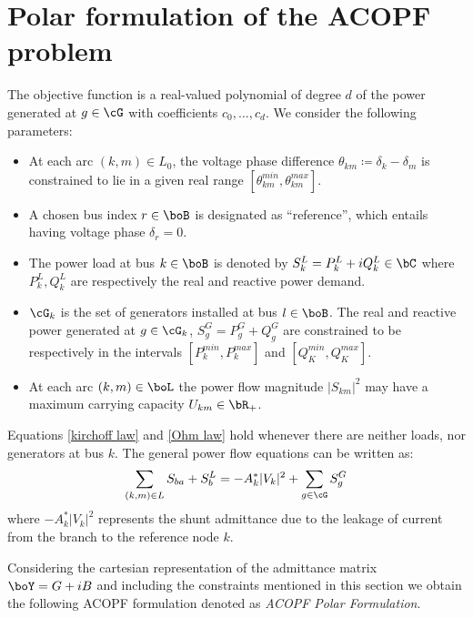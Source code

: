 \documentclass[11pt,a4paper,oneside,openany]{book}
\numberwithin{definition}{section}
\numberwithin{theorem}{section}
\numberwithin{problem}{section}
\begin{document}
\section{Polar formulation of the ACOPF problem}
The objective function is a real-valued polynomial of degree $d$ of the power generated at $g \in \cG$ with coefficients $c_{0},\ldots,c_{d}$.
We consider the following parameters:
\begin{itemize}
    
    \item At each arc $(k,m) \in L_0$, the voltage phase difference $\theta_{km} \coloneqq \delta_k - \delta_m$ is constrained to lie in a given real range $[\theta_{km}^{min}, \theta_{km}^{max}]$.
    \item A chosen bus index $r \in \boB$ is designated as ``reference'', which entails having voltage phase $\delta_r = 0$.
    \item The power load at bus $k \in \boB$ is denoted by $S^L_k = P^L_k + iQ^L_k \in \bC$ where $P^L_k, Q^L_k$ are respectively the real and reactive power demand.
    \item  $\cG_k$ is the set of generators installed at bus $l \in \boB$.  The real and reactive power generated at $g \in \cG_k$, $S^G_g = P^G_g + Q^G_g$ are  constrained to be respectively in the intervals $[P_k^{min}, P_k^{max}]$ and $[Q_K^{min},Q_K^{max}]$.
    \item At each arc $(k,m) \in \boL$ the power flow magnitude $|S_{km}|^2$ may have a maximum carrying capacity $U_{km} \in \bR_+$.
\end{itemize}

Equations \eqref{kirchoff law} and \eqref{Ohm law} hold whenever there are neither loads, nor generators at bus $k$. The general power flow equations can be written as:
\begin{equation}
    \sum_{(k,m) \in L} S_{ba} + S_b^L = -A_k^*|V_k|^2 + \sum_{g \in \cG}S^G_g
\end{equation}
where $-A_k^*|V_k|^2$ represents the shunt admittance due to the leakage of current from the branch to the reference node $k$.

 Considering the cartesian representation of the admittance matrix $\boY = G + iB$ and including the constraints mentioned in this section we obtain the following ACOPF formulation denoted as \emph{ACOPF Polar Formulation}. 
\end{document}
